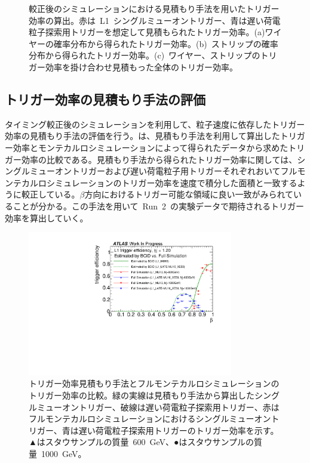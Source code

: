 \begin{figure}[tbp]
\begin{minipage}{0.99\hsize}
    \subcaption{}
    \end{minipage}
    \caption[較正後のシミュレーションにおける見積もり手法を用いたトリガー効率の算出]{較正後のシミュレーションにおける見積もり手法を用いたトリガー効率の算出。赤は~L1~シングルミューオントリガー、青は遅い荷電粒子探索用トリガーを想定して見積もられたトリガー効率。(a)ワイヤーの確率分布から得られたトリガー効率。(b)~ストリップの確率分布から得られたトリガー効率。(c)~ワイヤー、ストリップのトリガー効率を掛け合わせ見積もった全体のトリガー効率。}\label{fig:efftune}
\end{figure}


\subsection{トリガー効率の見積もり手法の評価}\label{chap:caltri}
タイミング較正後のシミュレーションを利用して、粒子速度に依存したトリガー効率の見積もり手法の評価を行う。は、見積もり手法を利用して算出したトリガー効率とモンテカルロシミュレーションによって得られたデータから求めたトリガー効率の比較である。見積もり手法から得られたトリガー効率に関しては、シングルミューオントリガーおよび遅い荷電粒子用トリガーそれぞれおいてフルモンテカルロシミュレーションのトリガー効率を速度で積分した面積と一致するように較正している。$\beta$方向におけるトリガー可能な領域に良い一致がみられていることが分かる。この手法を用いて~Run~2~の実験データで期待されるトリガー効率を算出していく。

\begin{figure}[tbp]
    \centering   
    \includegraphics[width=0.8\textwidth,page=1]{img/rec/vs.pdf}
    \caption[トリガー効率見積もり手法とフルモンテカルロシミュレーションのトリガー効率の比較]{トリガー効率見積もり手法とフルモンテカルロシミュレーションのトリガー効率の比較。緑の実線は見積もり手法から算出したシングルミューオントリガー、破線は遅い荷電粒子探索用トリガー、赤はフルモンテカルロシミュレーションにおけるシングルミューオントリガー、青は遅い荷電粒子探索用トリガーのトリガー効率を示す。▲はスタウサンプルの質量~600~GeV、●はスタウサンプルの質量~1000~GeV。}\label{fig:comp}
\end{figure}

